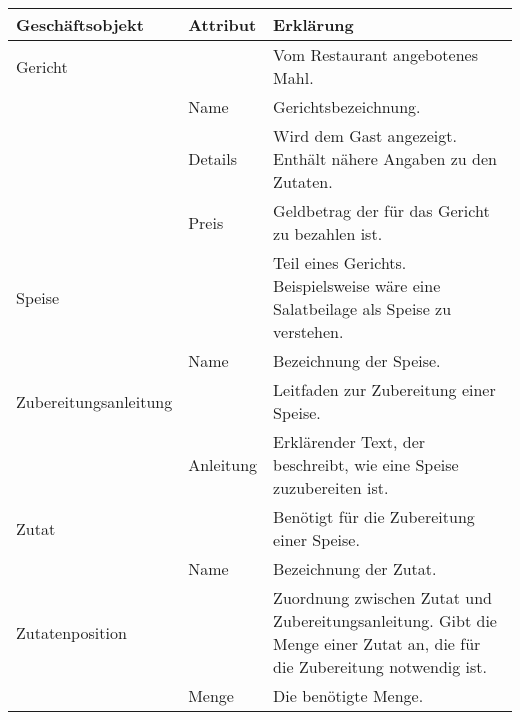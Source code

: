 \begin{tabu} to \linewidth {X|X|X}
\hline
{}
Gesch\"aftsobjekt &Attribut &Erkl\"arung \\
\hline
Gericht & &Vom Restaurant angebotenes Mahl. \\
  \hline
  &Name &Gerichtsbezeichnung. \\
  \hline
  &Details &Wird dem Gast angezeigt. Enth\"alt n\"ahere Angaben zu den Zutaten. \\
  \hline
  &Preis &Geldbetrag der f\"ur das Gericht zu bezahlen ist. \\
\hline
Speise & &Teil eines Gerichts. Beispielsweise w\"are eine Salatbeilage als Speise zu verstehen. \\
  \hline
  &Name &Bezeichnung der Speise. \\
\hline
Zubereitungsanleitung & &Leitfaden zur Zubereitung einer Speise. \\
  \hline
  &Anleitung &Erkl\"arender Text, der beschreibt, wie eine Speise zuzubereiten ist. \\
\hline
Zutat & &Ben\"otigt f\"ur die Zubereitung einer Speise. \\
  \hline
  &Name &Bezeichnung der Zutat. \\
\hline
Zutatenposition & &Zuordnung zwischen Zutat und Zubereitungsanleitung.
                 Gibt die Menge einer Zutat an, die f\"ur die Zubereitung notwendig ist. \\
  \hline
  &Menge &Die ben\"otigte Menge. \\
\hline
\end{tabu}
